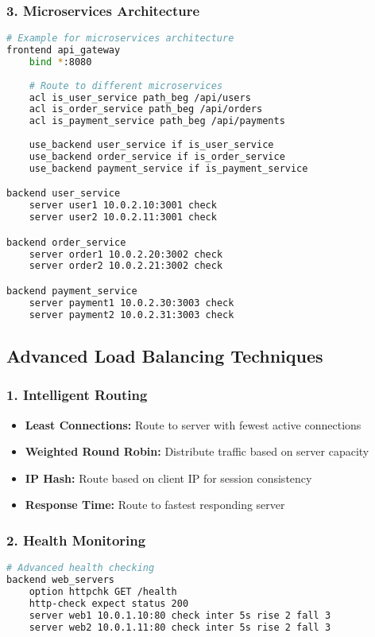 \documentclass[12pt]{article}
\begin{document}
\subsubsection{3. Microservices Architecture}
\begin{lstlisting}[language=bash, caption=Microservices Load Balancer Configuration]
# Example for microservices architecture
frontend api_gateway
    bind *:8080
    
    # Route to different microservices
    acl is_user_service path_beg /api/users
    acl is_order_service path_beg /api/orders
    acl is_payment_service path_beg /api/payments
    
    use_backend user_service if is_user_service
    use_backend order_service if is_order_service
    use_backend payment_service if is_payment_service

backend user_service
    server user1 10.0.2.10:3001 check
    server user2 10.0.2.11:3001 check

backend order_service
    server order1 10.0.2.20:3002 check
    server order2 10.0.2.21:3002 check

backend payment_service
    server payment1 10.0.2.30:3003 check
    server payment2 10.0.2.31:3003 check
\end{lstlisting}

\subsection{Advanced Load Balancing Techniques}

\subsubsection{1. Intelligent Routing}
\begin{itemize}
    \item \textbf{Least Connections:} Route to server with fewest active connections
    \item \textbf{Weighted Round Robin:} Distribute traffic based on server capacity
    \item \textbf{IP Hash:} Route based on client IP for session consistency
    \item \textbf{Response Time:} Route to fastest responding server
\end{itemize}

\subsubsection{2. Health Monitoring}
\begin{lstlisting}[language=bash, caption=Health Check Configuration]
# Advanced health checking
backend web_servers
    option httpchk GET /health
    http-check expect status 200
    server web1 10.0.1.10:80 check inter 5s rise 2 fall 3
    server web2 10.0.1.11:80 check inter 5s rise 2 fall 3
\end{lstlisting}
\end{document}
